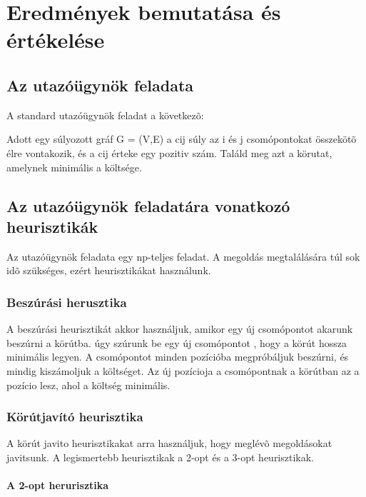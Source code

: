 \chapter{Eredmények bemutatása és értékelése}\label{ch:elemzes}


\section{Az utazóügynök feladata}

A standard utazóügynök feladat a következõ:

Adott egy súlyozott gráf G = (V,E) a cij súly az i és j csomópontokat
összekötõ élre vontakozik, és a cij érteke egy pozitiv szám. Találd meg azt a
körutat, amelynek minimális a költsége.

\section{Az utazóügynök feladatára vonatkozó heurisztikák}

Az utazóügynök feladata egy np-teljes feladat. A megoldás megtalálására túl
sok idõ szükséges, ezért heurisztikákat használunk.

\subsection{Beszúrási herusztika}

A beszúrási heurisztikát akkor használjuk, amikor egy új 
csomópontot akarunk beszúrni a körútba. úgy szúrunk 
be egy új csomópontot , hogy a körút hossza minimális 
legyen. A csomópontot minden pozícióba megpróbáljuk 
beszúrni, és mindig kiszámoljuk a költséget. Az új 
pozícioja a csomópontnak a körútban az a pozício lesz, 
ahol a költség minimális.

\subsection{Körútjavító heurisztika}

A körút javito heurisztikakat arra használjuk, hogy meglévõ 
megoldásokat javitsunk. A legismertebb heurisztikak a 2-opt és a 
3-opt heurisztikak.

\subsubsection{A 2-opt herurisztika}

